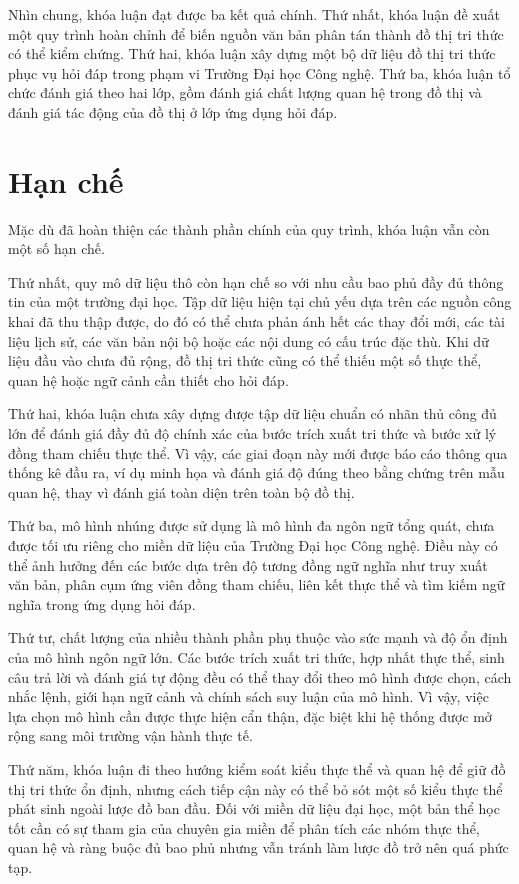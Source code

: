 Nhìn chung, khóa luận đạt được ba kết quả chính. Thứ nhất, khóa luận đề xuất một quy trình hoàn chỉnh để biến nguồn văn bản phân tán thành đồ thị tri thức có thể kiểm chứng. Thứ hai, khóa luận xây dựng một bộ dữ liệu đồ thị tri thức phục vụ hỏi đáp trong phạm vi Trường Đại học Công nghệ. Thứ ba, khóa luận tổ chức đánh giá theo hai lớp, gồm đánh giá chất lượng quan hệ trong đồ thị và đánh giá tác động của đồ thị ở lớp ứng dụng hỏi đáp.

\section{Hạn chế}

Mặc dù đã hoàn thiện các thành phần chính của quy trình, khóa luận vẫn còn một số hạn chế.

Thứ nhất, quy mô dữ liệu thô còn hạn chế so với nhu cầu bao phủ đầy đủ thông tin của một trường đại học. Tập dữ liệu hiện tại chủ yếu dựa trên các nguồn công khai đã thu thập được, do đó có thể chưa phản ánh hết các thay đổi mới, các tài liệu lịch sử, các văn bản nội bộ hoặc các nội dung có cấu trúc đặc thù. Khi dữ liệu đầu vào chưa đủ rộng, đồ thị tri thức cũng có thể thiếu một số thực thể, quan hệ hoặc ngữ cảnh cần thiết cho hỏi đáp.

Thứ hai, khóa luận chưa xây dựng được tập dữ liệu chuẩn có nhãn thủ công đủ lớn để đánh giá đầy đủ độ chính xác của bước trích xuất tri thức và bước xử lý đồng tham chiếu thực thể. Vì vậy, các giai đoạn này mới được báo cáo thông qua thống kê đầu ra, ví dụ minh họa và đánh giá độ đúng theo bằng chứng trên mẫu quan hệ, thay vì đánh giá toàn diện trên toàn bộ đồ thị.

Thứ ba, mô hình nhúng được sử dụng là mô hình đa ngôn ngữ tổng quát, chưa được tối ưu riêng cho miền dữ liệu của Trường Đại học Công nghệ. Điều này có thể ảnh hưởng đến các bước dựa trên độ tương đồng ngữ nghĩa như truy xuất văn bản, phân cụm ứng viên đồng tham chiếu, liên kết thực thể và tìm kiếm ngữ nghĩa trong ứng dụng hỏi đáp.

Thứ tư, chất lượng của nhiều thành phần phụ thuộc vào sức mạnh và độ ổn định của mô hình ngôn ngữ lớn. Các bước trích xuất tri thức, hợp nhất thực thể, sinh câu trả lời và đánh giá tự động đều có thể thay đổi theo mô hình được chọn, cách nhắc lệnh, giới hạn ngữ cảnh và chính sách suy luận của mô hình. Vì vậy, việc lựa chọn mô hình cần được thực hiện cẩn thận, đặc biệt khi hệ thống được mở rộng sang môi trường vận hành thực tế.

Thứ năm, khóa luận đi theo hướng kiểm soát kiểu thực thể và quan hệ để giữ đồ thị tri thức ổn định, nhưng cách tiếp cận này có thể bỏ sót một số kiểu thực thể phát sinh ngoài lược đồ ban đầu. Đối với miền dữ liệu đại học, một bản thể học tốt cần có sự tham gia của chuyên gia miền để phân tích các nhóm thực thể, quan hệ và ràng buộc đủ bao phủ nhưng vẫn tránh làm lược đồ trở nên quá phức tạp.

